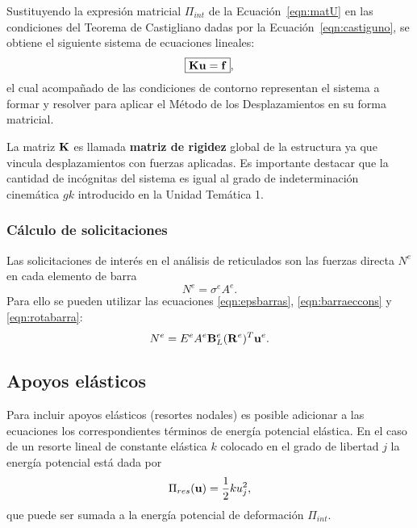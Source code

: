 Sustituyendo la expresión matricial $\Pi_{int}$ de la Ecuación~\eqref{eqn:matU} en las condiciones del Teorema de Castigliano dadas por la Ecuación~\eqref{eqn:castiguno}, se obtiene el siguiente sistema de ecuaciones lineales:
%
\begin{equation}
\boxed{
	{\bf K} {\bf u} = {\bf f}
},
\end{equation}
%
el cual acompañado de las condiciones de contorno representan el sistema a formar y resolver para aplicar el Método de los Desplazamientos en su forma matricial. %

La matriz ${\bf K}$ es llamada \textbf{matriz de rigidez} global de la estructura ya que vincula desplazamientos con fuerzas aplicadas. %
%
Es importante destacar que la cantidad de incógnitas del sistema es igual al grado de indeterminación cinemática $gk$ introducido en la Unidad Temática 1.

	\subsubsection{Cálculo de solicitaciones}

Las solicitaciones de interés en el análisis de reticulados son las fuerzas directa $N^e$ en cada elemento de barra
%
\begin{equation}
N^e = \sigma^e A^e.
\end{equation}
%
Para ello se pueden utilizar las ecuaciones \eqref{eqn:epsbarras}, \eqref{eqn:barraeccons} y \eqref{eqn:rotabarra}:
%
\begin{equation}\label{eqn:expSolic}
N^e = E^e A^e {\bf B}_L^e ({\bf R}^e)^T {\bf u}^e.
\end{equation}



\subsection{Apoyos elásticos}

Para incluir apoyos elásticos (resortes nodales) es posible adicionar a las ecuaciones los correspondientes términos de energía potencial elástica. %
%
En el caso de un resorte lineal de constante elástica $k$ colocado en el grado de libertad $j$ la energía potencial está dada por
%
\begin{equation}
\Pi_{res}({\bf u}) = \frac{1}{2} k u_j^2,
\end{equation}
%
que puede ser sumada a la energía potencial de deformación $\Pi_{int}$.











